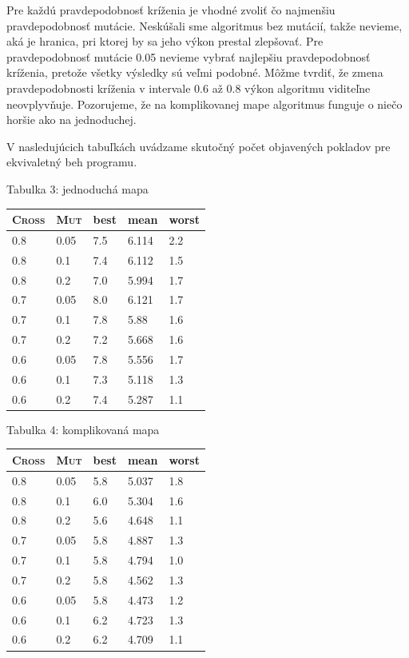 \documentclass[10pt]{paper}
\begin{document}
Pre každú pravdepodobnosť kríženia je vhodné zvoliť čo najmenšiu pravdepodobnosť mutácie. Neskúšali sme algoritmus bez mutácií, takže nevieme, aká je hranica, pri ktorej by sa jeho výkon prestal zlepšovať. Pre pravdepodobnosť mutácie 0.05 nevieme vybrať najlepšiu pravdepodobnosť kríženia, pretože všetky výsledky sú veľmi podobné. Môžme tvrdiť, že zmena pravdepodobnosti kríženia v intervale 0.6 až 0.8 výkon algoritmu viditeľne neovplyvňuje. Pozorujeme, že na komplikovanej mape algoritmus funguje o niečo horšie ako na jednoduchej. 

V nasledujúcich tabuľkách uvádzame skutočný počet objavených pokladov pre ekvivaletný beh programu.
\begin{center}
\begin{paracol}{2}
\setlength{\columnseprule}{0pt}
\setlength{\columnsep}{0em}
\begin{leftcolumn}
	Tabulka 3: jednoduchá mapa
	
	
\begin{tabular}{|ll|lll|}
\hline
 \textsc{Cross} & \textsc{Mut}  & best & mean & worst \\ \hline
0.8 & 0.05 & 7.5 & 6.114 & 2.2 \\
0.8 & 0.1 & 7.4 & 6.112 & 1.5 \\
0.8 & 0.2 & 7.0 & 5.994 & 1.7 \\
\hline
0.7 & 0.05 & 8.0 & 6.121 & 1.7 \\
0.7 & 0.1 & 7.8 & 5.88 & 1.6 \\
0.7 & 0.2 & 7.2 & 5.668 & 1.6 \\
\hline
0.6 & 0.05 & 7.8 & 5.556 & 1.7 \\
0.6 & 0.1 & 7.3 & 5.118 & 1.3 \\
0.6 & 0.2 & 7.4 & 5.287 & 1.1 \\
		
\hline
\end{tabular}
\end{leftcolumn}

\begin{rightcolumn}

	Tabulka 4: komplikovaná mapa
\begin{tabular}{|ll|lll|}
\hline
 \textsc{Cross} & \textsc{Mut}  & best & mean & worst \\ \hline

0.8 & 0.05 & 5.8 & 5.037 & 1.8 \\
0.8 & 0.1 & 6.0 & 5.304 & 1.6 \\
0.8 & 0.2 & 5.6 & 4.648 & 1.1 \\
\hline
0.7 & 0.05 & 5.8 & 4.887 & 1.3 \\
0.7 & 0.1 & 5.8 & 4.794 & 1.0 \\
0.7 & 0.2 & 5.8 & 4.562 & 1.3 \\
\hline
0.6 & 0.05 & 5.8 & 4.473 & 1.2 \\
0.6 & 0.1 & 6.2 & 4.723 & 1.3 \\
0.6 & 0.2 & 6.2 & 4.709 & 1.1 \\
		

\end{tabular}
\end{rightcolumn}
\end{paracol}
\end{center}
\end{document}
